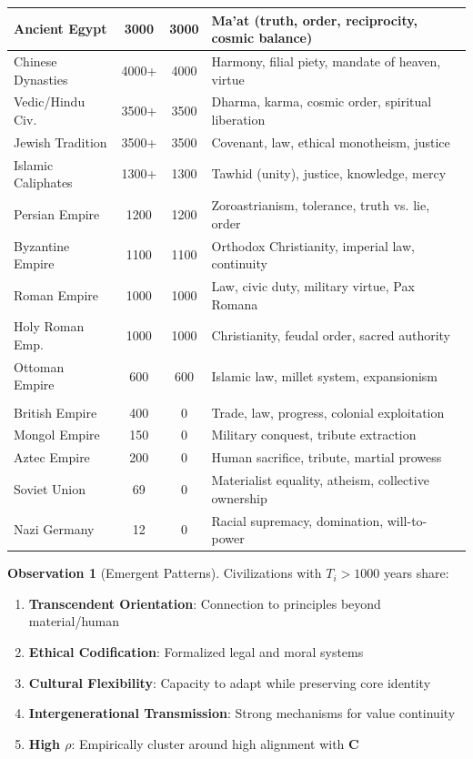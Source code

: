\documentclass[11pt,a4paper]{article}
\theoremstyle{definition}
\newtheorem{observation}{Observation}[section]
\theoremstyle{remark}
\begin{document}
\begin{small}
\begin{longtable}{|l|c|c|p{5cm}|}
Ancient Egypt & 3000 & 3000 & Ma'at (truth, order, reciprocity, cosmic balance) \\
\hline
Chinese Dynasties & 4000+ & 4000 & Harmony, filial piety, mandate of heaven, virtue \\
\hline
Vedic/Hindu Civ. & 3500+ & 3500 & Dharma, karma, cosmic order, spiritual liberation \\
\hline
Jewish Tradition & 3500+ & 3500 & Covenant, law, ethical monotheism, justice \\
\hline
Islamic Caliphates & 1300+ & 1300 & Tawhid (unity), justice, knowledge, mercy \\
\hline
Persian Empire & 1200 & 1200 & Zoroastrianism, tolerance, truth vs. lie, order \\
\hline
Byzantine Empire & 1100 & 1100 & Orthodox Christianity, imperial law, continuity \\
\hline
Roman Empire & 1000 & 1000 & Law, civic duty, military virtue, Pax Romana \\
\hline
Holy Roman Emp. & 1000 & 1000 & Christianity, feudal order, sacred authority \\
\hline
Ottoman Empire & 600 & 600 & Islamic law, millet system, expansionism \\
\hline
\rowcolor{gray!20}
\multicolumn{4}{|c|}{\textbf{Below Threshold (Unstable or Collapsed)}} \\
\hline
British Empire & 400 & 0 & Trade, law, progress, colonial exploitation \\
\hline
Mongol Empire & 150 & 0 & Military conquest, tribute extraction \\
\hline
Aztec Empire & 200 & 0 & Human sacrifice, tribute, martial prowess \\
\hline
Soviet Union & 69 & 0 & Materialist equality, atheism, collective ownership \\
\hline
Nazi Germany & 12 & 0 & Racial supremacy, domination, will-to-power \\
\hline
\end{longtable}


\begin{observation}[Emergent Patterns]
Civilizations with \(T_i > 1000\) years share:
\begin{enumerate}
\item \textbf{Transcendent Orientation}: Connection to principles beyond material/human
\item \textbf{Ethical Codification}: Formalized legal and moral systems
\item \textbf{Cultural Flexibility}: Capacity to adapt while preserving core identity
\item \textbf{Intergenerational Transmission}: Strong mechanisms for value continuity
\item \textbf{High \(\rho\)}: Empirically cluster around high alignment with \(\mathbf{C}\)
\end{enumerate}


\end{observation}
\end{small}
\end{document}
